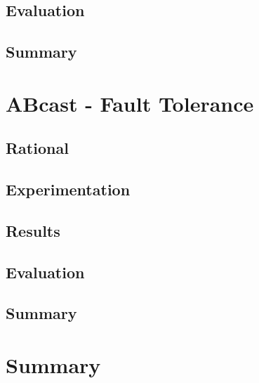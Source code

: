     \subsection{Evaluation}
    
    \subsection{Summary}

\section{ABcast - Fault Tolerance}
    \subsection{Rational}
    
    \subsection{Experimentation}
    
    \subsection{Results}
    
    \subsection{Evaluation}
    
    \subsection{Summary}
    
\section{Summary}